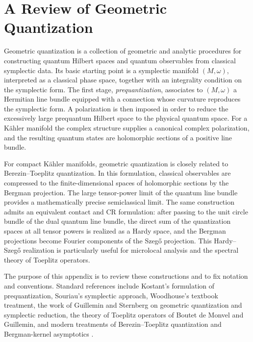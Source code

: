 \documentclass[a4paper,11pt]{article}
\theoremstyle{definition}
\begin{document}
\section{A Review of Geometric Quantization}
\label{app:geometric_quantization}

Geometric quantization is a collection of geometric and analytic procedures for
constructing quantum Hilbert spaces and quantum observables from classical
symplectic data.  Its basic starting point is a symplectic manifold
$(M,\omega)$, interpreted as a classical phase space, together with an
integrality condition on the symplectic form.  The first stage,
\emph{prequantization}, associates to $(M,\omega)$ a Hermitian line bundle
equipped with a connection whose curvature reproduces the symplectic form.
A polarization is then imposed in order to reduce the excessively large
prequantum Hilbert space to the physical quantum space.  For a K\"ahler
manifold the complex structure supplies a canonical complex polarization, and
the resulting quantum states are holomorphic sections of a positive line
bundle.

For compact K\"ahler manifolds, geometric quantization is closely related to
Berezin--Toeplitz quantization.  In this formulation, classical observables are
compressed to the finite-dimensional spaces of holomorphic sections by the
Bergman projection.  The large tensor-power limit of the quantum line bundle
provides a mathematically precise semiclassical limit.  The same construction
admits an equivalent contact and CR formulation: after passing to the unit
circle bundle of the dual quantum line bundle, the direct sum of the
quantization spaces at all tensor powers is realized as a Hardy space, and
the Bergman projections become Fourier components of the Szeg\H{o}
projection.  This Hardy--Szeg\H{o} realization is particularly useful for
microlocal analysis and the spectral theory of Toeplitz operators.

The purpose of this appendix is to review these constructions and to fix
notation and conventions.  Standard references include
Kostant's formulation of prequantization, Souriau's symplectic approach,
Woodhouse's textbook treatment, the work of Guillemin and Sternberg on
geometric quantization and symplectic reduction, the theory of Toeplitz
operators of Boutet de Monvel and Guillemin, and modern treatments of
Berezin--Toeplitz quantization and Bergman-kernel asymptotics
\cite{Kostant1970,Souriau1966,Woodhouse1992,GuilleminSternberg1977,
BoutetGuillemin1981,Schlichenmaier2010,MaMarinescu2007}.
\end{document}
